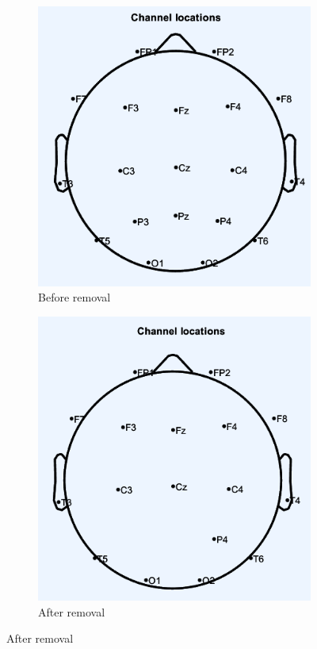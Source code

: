 \documentclass[hidelinks,12pt]{article}
\begin{document}
		
		\begin{figure}[!h]
			\centering
			\begin{subfigure}{0.3\textwidth}
				\centering
				\includegraphics[width=\linewidth]{13}
				\caption{Before removal}
			\end{subfigure}
			\hspace{1cm}
			\begin{subfigure}{0.3\textwidth}
				\centering
				\includegraphics[width=\linewidth]{14}
				\caption{After removal}
			\end{subfigure}
		\end{figure}
		
\end{document}
